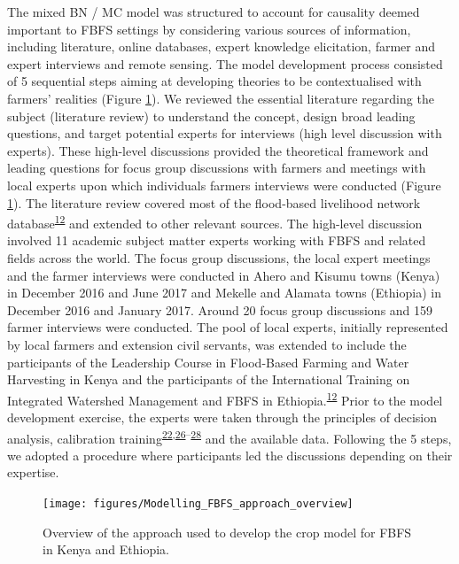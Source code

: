 \documentclass[11pt,preprint]{article}
\begin{document}
The mixed BN / MC model was structured to account for causality deemed
important to FBFS settings by considering various sources of
information, including literature, online databases, expert knowledge
elicitation, farmer and expert interviews and remote sensing. The model
development process consisted of 5 sequential steps aiming at developing
theories to be contextualised with farmers' realities (Figure
\ref{Figure_3}). We reviewed the essential literature regarding the
subject (literature review) to understand the concept, design broad
leading questions, and target potential experts for interviews (high
level discussion with experts). These high-level discussions provided
the theoretical framework and leading questions for focus group
discussions with farmers and meetings with local experts upon which
individuals farmers interviews were conducted (Figure \ref{Figure_3}).
The literature review covered most of the flood-based livelihood network
database\textsuperscript{\protect\hyperlink{ref-FBLN_2018}{12}} and
extended to other relevant sources. The high-level discussion involved
11 academic subject matter experts working with FBFS and related fields
across the world. The focus group discussions, the local expert meetings
and the farmer interviews were conducted in Ahero and Kisumu towns
(Kenya) in December 2016 and June 2017 and Mekelle and Alamata towns
(Ethiopia) in December 2016 and January 2017. Around 20 focus group
discussions and 159 farmer interviews were conducted. The pool of local
experts, initially represented by local farmers and extension civil
servants, was extended to include the participants of the Leadership
Course in Flood-Based Farming and Water Harvesting in Kenya and the
participants of the International Training on Integrated Watershed
Management and FBFS in
Ethiopia.\textsuperscript{\protect\hyperlink{ref-FBLN_2018}{12}} Prior
to the model development exercise, the experts were taken through the
principles of decision analysis, calibration
training\textsuperscript{\protect\hyperlink{ref-Hubbard_2014}{22},\protect\hyperlink{ref-Luedeling_et_al_2015}{26}--\protect\hyperlink{ref-Whitney_et_al_2018a}{28}}
and the available data. Following the 5 steps, we adopted a procedure
where participants led the discussions depending on their expertise.

\begin{figure}[!htbp]
    \centering
    \texttt{[image: figures/Modelling\_FBFS\_approach\_overview]}
    \caption{Overview of the approach used to develop the crop model for FBFS in Kenya and            Ethiopia.
    \label{Figure_3}}
\end{figure}
\end{document}
